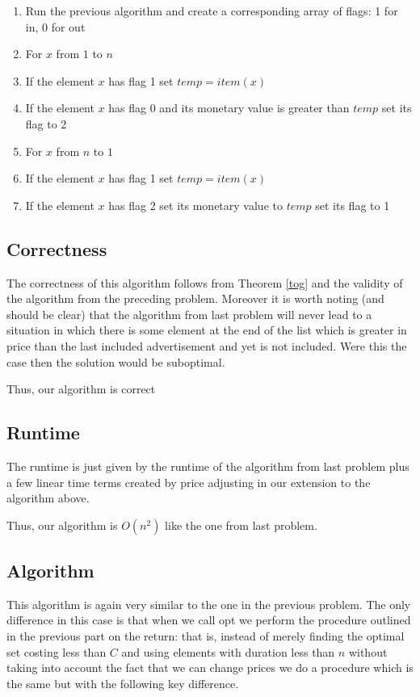 \documentclass{article}
\begin{document}
\begin{enumerate}
\item Run the previous algorithm and create a corresponding array of flags: 1 for in, 0 for out
\item For $x$ from $1$ to $n$
\item If the element $x$ has flag 1 set $temp=item(x)$
\item If the element $x$ has flag 0 and its monetary value is greater than $temp$ set its flag to 2
\item For $x$ from $n$ to $1$
\item If the element $x$ has flag 1 set $temp=item(x)$
\item If the element $x$ has flag 2 set its monetary value to $temp$ set its flag to 1
\end{enumerate}

\subsection{Correctness}
The correctness of this algorithm follows from Theorem \ref{tog} and the validity of the algorithm from the preceding problem. Moreover it is worth noting (and should be clear) that the algorithm from last problem will never lead to a situation in which there is some element at the end of the list which is greater in price than the last included advertisement and yet is not included. Were this the case then the solution would be suboptimal.

Thus, our algorithm is correct

\subsection{Runtime}
The runtime is just given by the runtime of the algorithm from last problem plus a few linear time terms created by price adjusting in our extension to the algorithm above.

Thus, our algorithm is $O(n^2)$ like the one from last problem.

\subsection{Algorithm}
This algorithm is again very similar to the one in the previous problem. The only difference in this case is that when we call opt we perform the procedure outlined in the previous part on the return: that is, instead of merely finding the optimal set costing less than $C$ and using elements with duration less than $n$ without taking into account the fact that we can change prices we do a procedure which is the same but with the following key difference.
\end{document}
